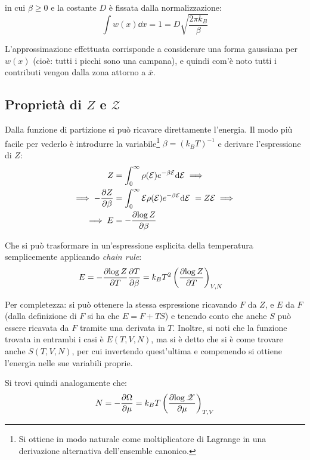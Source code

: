 \noindent in cui $\beta \geq 0$ e la costante $D$ è fissata dalla normalizzazione:
\begin{equation*}
\int w(x) \dd x = 1 = D \sqrt{\frac{2 \pi k_B}{\beta}}
\end{equation*}

L'approssimazione effettuata corrisponde a considerare una forma gaussiana per $w(x)$ (cioè: tutti i picchi sono una campana), e quindi com'è noto tutti i contributi vengon dalla zona attorno a $\bar{x}$.

\subsection{Proprietà di $Z$ e $\mathcal{Z}$}

Dalla funzione di partizione si può ricavare direttamente l'energia. Il modo più facile per vederlo è introdurre la variabile\footnote{Si ottiene in modo naturale come moltiplicatore di Lagrange in una derivazione alternativa dell'ensemble canonico.} $\beta = (k_B T)^{-1}$ e derivare l'espressione di $Z$:
\begin{align*}
Z &= \int_{0}^{\infty} \rho(\mathcal{E}) e^{-\beta \mathcal{E}}\dd \mathcal{E} \implies\\
\implies - \frac{\partial {Z}}{\partial {\beta}} &= \int_{0}^{\infty} \mathcal{E}\rho(\mathcal{E}) e^{-\beta \mathcal{E}}\dd \mathcal{E}\ = Z \mathcal{E} \implies\\
\implies E &= - \frac{\partial {\log Z}}{\partial {\beta}}
\end{align*}

Che si può trasformare in un'espressione esplicita della temperatura semplicemente applicando \textit{chain rule}:
\begin{align*}
E &= - \frac{\partial {\log Z}}{\partial {T}} \frac{\partial {T}}{\partial {\beta}} = k_B T^2 \left(\frac{\partial {\log Z}}{\partial {T}}\right)_{V,N}
\end{align*}

\noindent Per completezza: si può ottenere la stessa espressione ricavando $F$ da $Z$, e $E$ da $F$ (dalla definizione di $F$ si ha che $E = F + T S$) e tenendo conto che anche $S$ può essere ricavata da $F$ tramite una derivata in $T$. Inoltre, si noti che la funzione trovata in entrambi i casi è $E(T,V,N)$, ma si è detto che si è come trovare anche $ S(T,V,N) $, per cui invertendo quest'ultima e compenendo si ottiene l'energia nelle sue variabili proprie.

\begin{ex}
	Si trovi quindi analogamente che:
	\begin{equation*}
	N = - \frac{\partial {\Omega}}{\partial {\mu}} = k_B T \left(\frac{\partial {\log \mathscr{Z}}}{\partial {\mu}}\right)_{T,V}
	\end{equation*}
\end{ex}

